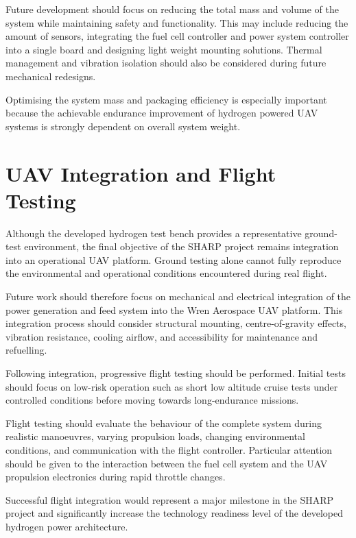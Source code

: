 Future development should focus on reducing the total mass and volume of the system while maintaining safety and functionality. This may include reducing the amount of sensors, integrating the fuel cell controller and power system controller into a single board and designing light weight mounting solutions. Thermal management and vibration isolation should also be considered during future mechanical redesigns.

Optimising the system mass and packaging efficiency is especially important because the achievable endurance improvement of hydrogen powered UAV systems is strongly dependent on overall system weight.

\section{UAV Integration and Flight Testing}
Although the developed hydrogen test bench provides a representative ground-test environment, the final objective of the SHARP project remains integration into an operational UAV platform. Ground testing alone cannot fully reproduce the environmental and operational conditions encountered during real flight.

Future work should therefore focus on mechanical and electrical integration of the power generation and feed system into the Wren Aerospace UAV platform. This integration process should consider structural mounting, centre-of-gravity effects, vibration resistance, cooling airflow, and accessibility for maintenance and refuelling.

Following integration, progressive flight testing should be performed. Initial tests should focus on low-risk operation such as short low altitude cruise tests under controlled conditions before moving towards long-endurance missions.

Flight testing should evaluate the behaviour of the complete system during realistic manoeuvres, varying propulsion loads, changing environmental conditions, and communication with the flight controller. Particular attention should be given to the interaction between the fuel cell system and the UAV propulsion electronics during rapid throttle changes.

Successful flight integration would represent a major milestone in the SHARP project and significantly increase the technology readiness level of the developed hydrogen power architecture.

\newpage

